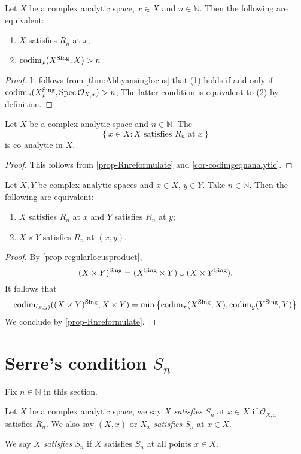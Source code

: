 \begin{proposition}\label{prop-Rnreformulate}
    Let $X$ be a complex analytic space, $x\in X$ and $n\in \mathbb{N}$. Then the following are equivalent:
    \begin{enumerate}
        \item $X$ satisfies $R_n$ at $x$;
        \item $\operatorname{codim}_x(X^{\operatorname{Sing}},X)>n$.
    \end{enumerate}
\end{proposition}
\begin{proof}
    It follows from \cref{thm:Abhyansinglocus} that (1) holds if and only if $\operatorname{codim}_x(X^{\operatorname{Sing}}_x,\operatorname{Spec} \mathcal{O}_{X,x})>n$, The latter condition is equivalent to (2) by definition.
\end{proof}

\begin{corollary}\label{cor-Rnlocuscoana}
    Let $X$ be a complex analytic space and $n\in \mathbb{N}$. The 
    \[
        \left\{x\in X: X\text{ satisfies }R_n \text{ at }x \right\}  
    \]
    is co-analytic in $X$.
\end{corollary}
\begin{proof}
    This follows from \cref{prop-Rnreformulate} and \cref{cor-codimgeqnanalytic}.
\end{proof}


\begin{proposition}\label{prop-Rnproduct}
    Let $X,Y$ be complex analytic spaces and $x\in X$, $y\in Y$. Take $n\in \mathbb{N}$. Then the following are equivalent:
    \begin{enumerate}
        \item $X$ satisfies $R_n$ at $x$ and $Y$ satisfies $R_n$ at $y$;
        \item $X\times Y$ satisfies $R_n$ at $(x,y)$.
    \end{enumerate}
\end{proposition}
\begin{proof}
    By \cref{prop-regularlocusproduct}, 
    \[
        (X\times Y)^{\operatorname{Sing}}=(X^{\operatorname{Sing}}\times Y)\cup (X\times Y^{\operatorname{Sing}}).  
    \]
    It follows that 
    \[
        \operatorname{codim}_{(x,y)}((X\times Y)^{\operatorname{Sing}},X\times Y)=  \min \left\{ \operatorname{codim}_x (X^{\operatorname{Sing}},X),\operatorname{codim}_y (Y^{\operatorname{Sing}},Y)\right\}
    \]
    We conclude by \cref{prop-Rnreformulate}.
\end{proof}

\section{Serre's condition \texorpdfstring{$S_n$}{Sn}}
Fix $n\in \mathbb{N}$ in this section.
\begin{definition}
    Let $X$ be a complex analytic space, we say $X$ \emph{satisfies $S_n$} at $x\in X$ if $\mathcal{O}_{X,x}$ satisfies $R_n$. We also say $(X,x)$ or $X_x$  \emph{satisfies $S_n$} at $x\in X$.

    We say $X$  \emph{satisfies $S_n$} if $X$ satisfies $S_n$ at all points $x\in X$. 
\end{definition}

